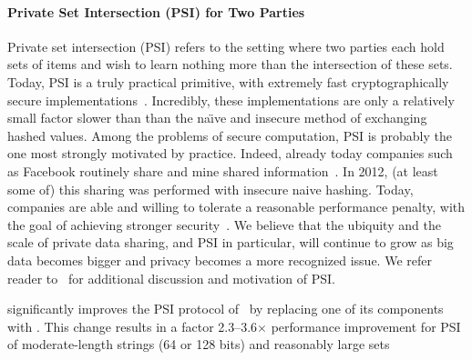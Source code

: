 

\paragraph{Private Set Intersection (PSI) for Two Parties}
Private set intersection (PSI) refers to the setting where two parties each hold sets of items and wish to learn nothing more than the intersection of these sets.
Today, PSI is a truly practical primitive, with extremely fast cryptographically secure implementations~\cite{DBLP:conf/uss/Pinkas0SZ15}. Incredibly, these implementations are only a relatively small factor slower than than the na\"{\i}ve and insecure method of exchanging hashed values.  Among the problems of secure computation, PSI is probably the one most strongly motivated by practice.  Indeed, already today companies such as Facebook  routinely share and mine shared information~\cite{effArticleFacebook,MotisCCStalk2015}.  In 2012, (at least some of) this  sharing was performed with insecure naive hashing.  Today, companies are able and willing to tolerate a reasonable performance penalty, with the goal of achieving stronger security~\cite{MotisCCStalk2015}.  We believe that the ubiquity and the scale of private data sharing, and PSI in particular, will continue to grow as big data becomes bigger and privacy becomes a more recognized issue.  We refer reader to~\cite{DBLP:conf/uss/Pinkas0SZ15,DBLP:conf/uss/Pinkas0Z14} for additional discussion and motivation of PSI.

\cite{CCS:KKRT16} significantly improves the PSI protocol of~\cite{DBLP:conf/uss/Pinkas0SZ15} by replacing one of its components with \batchOPRF. This change results in a factor 2.3--3.6$\times$ performance improvement for PSI of moderate-length strings (64 or 128 bits) and reasonably large sets  




